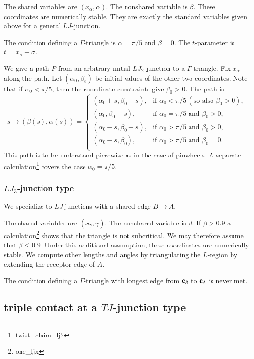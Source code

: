 The shared variables are $(x_\alpha,\alpha)$.  The nonshared variable
is $\beta$.  These coordinates are numerically stable.  They are
exactly the standard variables given above for a general
$LJ$-junction.

The condition defining a $\Gamma$-triangle is $\alpha=\pi/5$ and
$\beta=0$.  The $t$-parameter is $t =x_\alpha - \sigma$.

We give a path $P$ from an arbitrary initial $LJ_2$-junction to a
$\Gamma$-triangle.  Fix $x_\alpha$ along the path.  Let
$(\alpha_0,\beta_0)$ be initial values of the other two coordinates.
Note that if $\alpha_0<\pi/5$, then the coordinate constraints give
$\beta_0>0$.  The path is
\[
s\mapsto (\beta(s),\alpha(s)) = 
\begin{cases}
(\alpha_0+s,\beta_0-s),&\text{if } \alpha_0 < \pi/5 ~(\text{so also } \beta_0>0),\\
(\alpha_0,\beta_0-s),&\text{if } \alpha_0 = \pi/5 \text{ and } \beta_0 > 0,\\
(\alpha_0-s,\beta_0-s),&\text{if } \alpha_0 > \pi/5 \text{ and } \beta_0 > 0,\\
(\alpha_0-s,\beta_0),&\text{if } \alpha_0 > \pi/5 \text{ and } \beta_0 = 0.\\
\end{cases}
\]
This path is to be understood piecewise as in the case of pinwheels.
A separate calculation\footnote{twist\_claim\_lj2} covers the case
$\alpha_0=\pi/5$.


\subsubsection{$LJ_3$-junction type}

We specialize to $LJ$-junctions with a shared edge $B\to A$.

The shared variables are $(x_\gamma,\gamma)$.  The nonshared variable
is $\beta$.  If $\beta > 0.9$ a calculation\footnote{one\_ljx} shows
that the triangle is not subcritical.  We may therefore assume that
$\beta\le 0.9$.  Under this additional assumption, these coordinates
are numerically stable.  We compute other lengths and angles by
triangulating the $L$-region by extending the receptor edge of $A$.

The condition defining a $\Gamma$-triangle with longest edge from
${\mathbf c}_B$ to ${\mathbf c}_A$ is never met.

\subsection{triple contact at a $TJ$-junction type}


